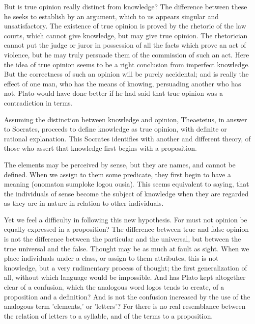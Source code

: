 \documentclass[11pt,letter]{article}
\begin{document}
\par  But is true opinion really distinct from knowledge? The difference between these he seeks to establish by an argument, which to us appears singular and unsatisfactory. The existence of true opinion is proved by the rhetoric of the law courts, which cannot give knowledge, but may give true opinion. The rhetorician cannot put the judge or juror in possession of all the facts which prove an act of violence, but he may truly persuade them of the commission of such an act. Here the idea of true opinion seems to be a right conclusion from imperfect knowledge. But the correctness of such an opinion will be purely accidental; and is really the effect of one man, who has the means of knowing, persuading another who has not. Plato would have done better if he had said that true opinion was a contradiction in terms.

\par  Assuming the distinction between knowledge and opinion, Theaetetus, in answer to Socrates, proceeds to define knowledge as true opinion, with definite or rational explanation. This Socrates identifies with another and different theory, of those who assert that knowledge first begins with a proposition.

\par  The elements may be perceived by sense, but they are names, and cannot be defined. When we assign to them some predicate, they first begin to have a meaning (onomaton sumploke logou ousia). This seems equivalent to saying, that the individuals of sense become the subject of knowledge when they are regarded as they are in nature in relation to other individuals.

\par  Yet we feel a difficulty in following this new hypothesis. For must not opinion be equally expressed in a proposition? The difference between true and false opinion is not the difference between the particular and the universal, but between the true universal and the false. Thought may be as much at fault as sight. When we place individuals under a class, or assign to them attributes, this is not knowledge, but a very rudimentary process of thought; the first generalization of all, without which language would be impossible. And has Plato kept altogether clear of a confusion, which the analogous word logos tends to create, of a proposition and a definition? And is not the confusion increased by the use of the analogous term 'elements,' or 'letters'? For there is no real resemblance between the relation of letters to a syllable, and of the terms to a proposition.
\end{document}
